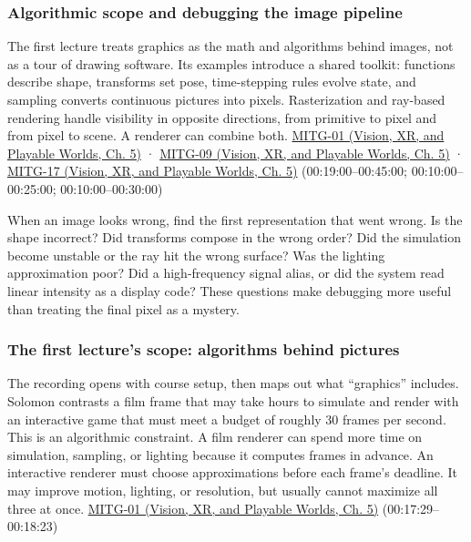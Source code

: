 \subsubsection{Algorithmic scope and debugging the image pipeline}\label{03-visual-computing-i-ch001-algorithmic-scope-and-debugging-the-image-pipeline}

\hypertarget{03-visual-computing-i-ch001-algorithmic-scope-and-debugging-the-image-pipeline}{}

The first lecture treats graphics as the math and algorithms behind images, not as a tour of drawing software. Its examples introduce a shared toolkit: functions describe shape, transforms set pose, time-stepping rules evolve state, and sampling converts continuous pictures into pixels. Rasterization and ray-based rendering handle visibility in opposite directions, from primitive to pixel and from pixel to scene. A renderer can combine both. \href{../07-Vision-XR-and-Playable-Worlds/main.pdf\#nameddest=04-visual-computing-ii-ch036-mitg-01---introduction}{MITG-01 (Vision, XR, and Playable Worlds, Ch. 5)} · \href{../07-Vision-XR-and-Playable-Worlds/main.pdf\#nameddest=04-visual-computing-ii-ch036-mitg-09---ray-casting}{MITG-09 (Vision, XR, and Playable Worlds, Ch. 5)} · \href{../07-Vision-XR-and-Playable-Worlds/main.pdf\#nameddest=04-visual-computing-ii-ch036-mitg-17---rasterization}{MITG-17 (Vision, XR, and Playable Worlds, Ch. 5)} (00:19:00--00:45:00; 00:10:00--00:25:00; 00:10:00--00:30:00)

When an image looks wrong, find the first representation that went wrong. Is the shape incorrect? Did transforms compose in the wrong order? Did the simulation become unstable or the ray hit the wrong surface? Was the lighting approximation poor? Did a high-frequency signal alias, or did the system read linear intensity as a display code? These questions make debugging more useful than treating the final pixel as a mystery.

\subsubsection{The first lecture's scope: algorithms behind pictures}\label{03-visual-computing-i-ch001-the-first-lectures-scope-algorithms-behind-pictures}

\hypertarget{03-visual-computing-i-ch001-the-first-lectures-scope-algorithms-behind-pictures}{}

The recording opens with course setup, then maps out what ``graphics'' includes. Solomon contrasts a film frame that may take hours to simulate and render with an interactive game that must meet a budget of roughly 30 frames per second. This is an algorithmic constraint. A film renderer can spend more time on simulation, sampling, or lighting because it computes frames in advance. An interactive renderer must choose approximations before each frame's deadline. It may improve motion, lighting, or resolution, but usually cannot maximize all three at once. \href{../07-Vision-XR-and-Playable-Worlds/main.pdf\#nameddest=04-visual-computing-ii-ch036-mitg-01---introduction}{MITG-01 (Vision, XR, and Playable Worlds, Ch. 5)} (00:17:29--00:18:23)

